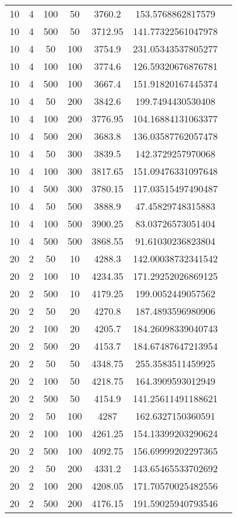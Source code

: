 {\begin{longtabu}{S
S
S
S
S
S[round-mode=places,round-precision=0]
S[round-mode=places,round-precision=0]}
10 & 4 & 100 & 50 & 3760.2 & 153.5768862817579 \\
10 & 4 & 500 & 50 & 3712.95 & 141.77322561047978 \\
10 & 4 & 50 & 100 & 3754.9 & 231.05343537805277 \\
10 & 4 & 100 & 100 & 3774.6 & 126.59320676876781 \\
10 & 4 & 500 & 100 & 3667.4 & 151.91820167445374 \\
10 & 4 & 50 & 200 & 3842.6 & 199.7494430530408 \\
10 & 4 & 100 & 200 & 3776.95 & 104.16884131063377 \\
10 & 4 & 500 & 200 & 3683.8 & 136.03587762057478 \\
10 & 4 & 50 & 300 & 3839.5 & 142.3729257970068 \\
10 & 4 & 100 & 300 & 3817.65 & 151.09476331097648 \\
10 & 4 & 500 & 300 & 3780.15 & 117.03515497490487 \\
10 & 4 & 50 & 500 & 3888.9 & 47.45829748315883 \\
10 & 4 & 100 & 500 & 3900.25 & 83.03726573051404 \\
10 & 4 & 500 & 500 & 3868.55 & 91.61030236823804 \\
20 & 2 & 50 & 10 & 4288.3 & 142.00038732341542 \\
20 & 2 & 100 & 10 & 4234.35 & 171.29252026869125 \\
20 & 2 & 500 & 10 & 4179.25 & 199.0052449057562 \\
20 & 2 & 50 & 20 & 4270.8 & 187.4893596980906 \\
20 & 2 & 100 & 20 & 4205.7 & 184.26098339040743 \\
20 & 2 & 500 & 20 & 4153.7 & 184.67487647213954 \\
20 & 2 & 50 & 50 & 4348.75 & 255.3583511459925 \\
20 & 2 & 100 & 50 & 4218.75 & 164.3909593012949 \\
20 & 2 & 500 & 50 & 4154.9 & 141.25611491188621 \\
20 & 2 & 50 & 100 & 4287 & 162.6327150360591 \\
20 & 2 & 100 & 100 & 4261.25 & 154.13399203290624 \\
20 & 2 & 500 & 100 & 4092.75 & 156.69999202297365 \\
20 & 2 & 50 & 200 & 4331.2 & 143.65465533702692 \\
20 & 2 & 100 & 200 & 4208.05 & 171.70570025482556 \\
20 & 2 & 500 & 200 & 4176.15 & 191.59025940793546 \\

\end{longtabu}}

